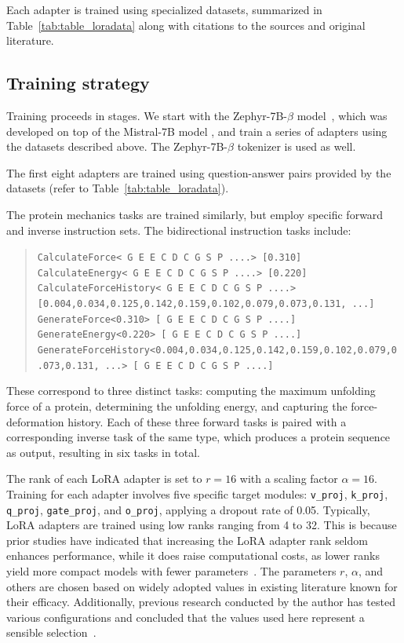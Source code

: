 Each adapter is trained using specialized datasets, summarized in Table~\ref{tab:table_loradata} along with citations to the sources and original literature.

\subsection{Training strategy} Training proceeds in stages. We start with the Zephyr-7B-$\beta$ model~\cite{HuggingFaceH4/zephyr-7b-betaFace}, which was developed on top of the Mistral-7B model \cite{Jiang2023Mistral7B}, and train a series of adapters using the datasets described above. The Zephyr-7B-$\beta$ tokenizer is used as well.

The first eight adapters are trained using question-answer pairs provided by the datasets (refer to Table~\ref{tab:table_loradata}).

The protein mechanics tasks are trained similarly, but employ specific forward and inverse instruction sets. The bidirectional instruction tasks include:

\begin{quote}
\tiny {\texttt{CalculateForce< G E E C D C G S P ....> [0.310]\\
CalculateEnergy< G E E C D C G S P ....> [0.220]\\ 
CalculateForceHistory< G E E C D C G S P ....> [0.004,0.034,0.125,0.142,0.159,0.102,0.079,0.073,0.131, ...]\\
GenerateForce<0.310>\,[ G E E C D C G S P ....]\\
GenerateEnergy<0.220>\,[ G E E C D C G S P ....]\\
GenerateForceHistory<0.004,0.034,0.125,0.142,0.159,0.102,0.079,0.073,0.131, ...>\,[ G E E C D C G S P ....] }}
\end{quote}

These correspond to three distinct tasks: computing the maximum unfolding force of a protein, determining the unfolding energy, and capturing the force-deformation history. Each of these three forward tasks is paired with a corresponding inverse task of the same type, which produces a protein sequence as output, resulting in six tasks in total.

The rank of each LoRA adapter is set to $r=16$ with a scaling factor $\alpha=16$. Training for each adapter involves five specific target modules: \texttt{v\_proj}, \texttt{k\_proj}, \texttt{q\_proj}, \texttt{gate\_proj}, and \texttt{o\_proj}, applying a dropout rate of 0.05. Typically, LoRA adapters are trained using low ranks ranging from 4 to 32. This is because prior studies have indicated that increasing the LoRA adapter rank seldom enhances performance, while it does raise computational costs, as lower ranks yield more compact models with fewer parameters~\cite{hu2021lora}. The parameters $r$, $\alpha$, and others are chosen based on widely adopted values in existing literature known for their efficacy. Additionally, previous research conducted by the author has tested various configurations and concluded that the values used here represent a sensible selection~\cite{Luu2023BioinspiredLLM:Materials}.

